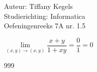 \documentclass[a4paper]{article}
\begin{document}
  
\noindent \large Auteur: Tiffany Kegels \\
\noindent \large Studierichting: Informatica\\
\noindent \large Oefeningenreeks 7A nr. 1.5\\

\medskip

\normalsize

$\lim\limits_{(x,y) \rightarrow (x,y)} \dfrac{x+y}{1 + xy}= \dfrac{0}{1} = 0$\\


\begin{thebibliography}{999}

\end{thebibliography}
\end{document}
